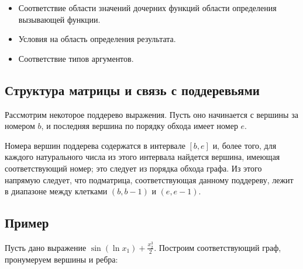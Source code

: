 \documentclass[12pt,a4paper]{amsart}
\begin{document}
\begin{itemize}
  \item Соответствие области значений дочерних функций области определения вызывающей функции.
  \item Условия на область определения результата.
  \item Соответствие типов аргументов.
\end{itemize}

\subsection{Структура матрицы и связь с поддеревьями}

Рассмотрим некоторое поддерево выражения. Пусть оно начинается с вершины за номером $b$, и последняя вершина по порядку
обхода имеет номер $e$.

Номера вершин поддерева содержатся в интервале $[b, e]$ и, более того, для каждого натурального числа из этого интервала
найдется вершина, имеющая соответствующий номер; это следует из порядка обхода графа. Из этого напрямую следует, что
подматрица, соответствующая данному поддереву, лежит в диапазоне между клетками $(b, b - 1)$ и $(e, e - 1)$.

\subsection{Пример}

Пусть дано выражение $ \sin (\ln x_1) + \frac{x_2^3}{2}$. Построим соответствующий граф, пронумеруем вершины и ребра:

\end{document}

